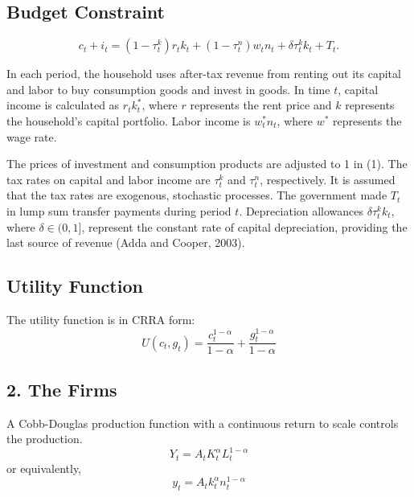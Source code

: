 \documentclass{article}
\begin{document}
\subsection*{Budget Constraint}

\begin{equation}
    c_t + i_t = \left(1 - \tau^k_t \right) r_t k_t + \left(1 - \tau^n_t \right) w_t n_t + \delta \tau^k_t k_t + T_t.
\end{equation}

In each period, the household uses after-tax revenue from renting out its capital and labor to buy consumption goods and invest in goods. In time \( t \), capital income is calculated as \( r_t k^*_t \), where \( r \) represents the rent price and \( k \) represents the household's capital portfolio. Labor income is \( w^*_t n_t \), where \( w^* \) represents the wage rate.

The prices of investment and consumption products are adjusted to 1 in (1). The tax rates on capital and labor income are \( \tau^k_t \) and \( \tau^n_t \), respectively. It is assumed that the tax rates are exogenous, stochastic processes. The government made \( T_t \) in lump sum transfer payments during period \( t \). Depreciation allowances \( \delta \tau^k_t k_t \), where \( \delta \in (0, 1] \), represent the constant rate of capital depreciation, providing the last source of revenue (Adda and Cooper, 2003).

\subsection*{Utility Function}

The utility function is in CRRA form:
\begin{equation}
    U(c_t, g_t) = \frac{c_t^{1-\alpha}}{1-\alpha} + \frac{g_t^{1-\alpha}}{1-\alpha}
\end{equation}

\subsection*{2. The Firms}

A Cobb-Douglas production function with a continuous return to scale controls the production.
\begin{equation}
    Y_t = A_t K_t^{\alpha} L_t^{1-\alpha}
\end{equation}
or equivalently,
\begin{equation}
    y_t = A_t k_t^{\alpha} n_t^{1-\alpha}
\end{equation}
\end{document}
